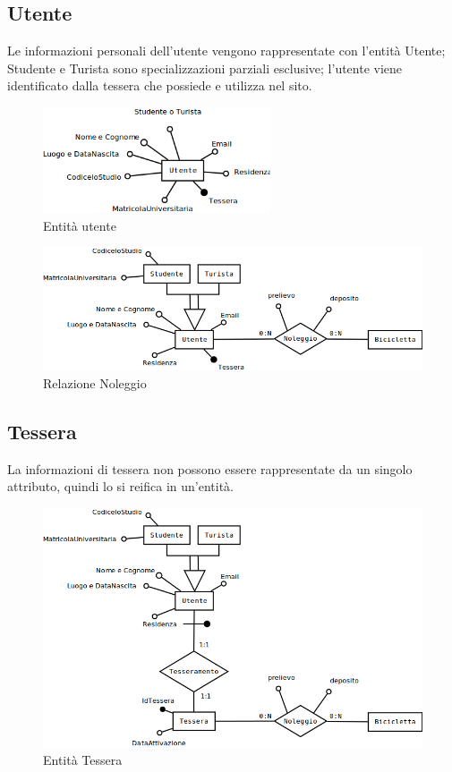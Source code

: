 \documentclass[a4paper,twoside]{article}
\begin{document}
\subsection{Utente}
Le informazioni personali dell'utente vengono rappresentate con l'entità Utente; Studente e Turista sono specializzazioni parziali esclusive; l'utente viene identificato dalla tessera che possiede e utilizza nel sito.
\begin{figure}[H]
 \centering
  \includegraphics[width=0.6\textwidth]{Concettuale02}
\caption{Entità utente}
\end{figure}
\begin{figure}[H]
 \centering
  \includegraphics[width=1\textwidth]{Concettuale03}
\caption{Relazione Noleggio}
\end{figure}
\subsection{Tessera}
La informazioni di tessera non possono essere rappresentate da un singolo attributo, quindi lo si reifica in un'entità.
\begin{figure}[H]
 \centering
  \includegraphics[width=1\textwidth]{Concettuale04}
\caption{Entità Tessera}
\end{figure}
\end{document}
